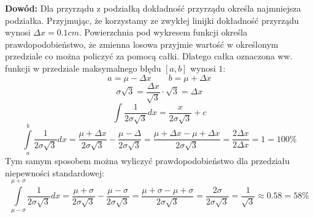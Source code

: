 \documentclass[../Fizyka.tex]{subfiles}
\begin{document}
    \textbf{Dowód:} Dla przyrządu z podziałką dokładność przyrządu określa najmniejsza podziałka. Przyjmując, że korzystamy ze zwykłej linijki 
    dokładność przyrządu wynosi \(\Delta x = 0.1cm\). Powierzchnia pod wykresem funkcji określa prawdopodobieństwo, że zmienna losowa przyjmie wartość w określonym przedziale
    co można policzyć za pomocą całki. Dlatego całka oznaczona ww. funkcji w przedziale maksymalnego błędu \([a,b]\) wynosi \(1\):
    \[a = \mu - \Delta x \qquad b = \mu + \Delta x \]
    \[\sigma\sqrt{3} = \frac{\Delta x}{\sqrt{3}} \cdot \sqrt{3} = \Delta x\]
    \[\int \frac{1}{2\sigma\sqrt{3}}dx = \frac{x}{2\sigma\sqrt{3}} + c\]
    \[
        \int\limits_a^b \frac{1}{2\sigma\sqrt{3}}dx =
        \frac{\mu + \Delta x}{2\sigma\sqrt{3}} - \frac{\mu - \Delta}{2\sigma\sqrt{3}} = 
        \frac{\mu + \Delta x - \mu + \Delta x}{2\sigma\sqrt{3}} = 
        \frac{2 \Delta x}{2 \Delta x} = 1 = 100\%
    \]
    Tym samym sposobem można wyliczyć prawdopodobieństwo dla przedziału niepewności standardowej:
    \[
        \int\limits_{\mu-\sigma}^{\mu+\sigma} \frac{1}{2\sigma\sqrt{3}}dx =
        \frac{\mu + \sigma}{2\sigma\sqrt{3}} - \frac{\mu - \sigma}{2\sigma\sqrt{3}} = 
        \frac{\mu + \sigma - \mu + \sigma}{2\sigma\sqrt{3}} = 
        \frac{2 \sigma}{2\sigma\sqrt{3}} = \frac{1}{\sqrt{3}} \approx 0.58 = 58\%
    \]
\end{document}
